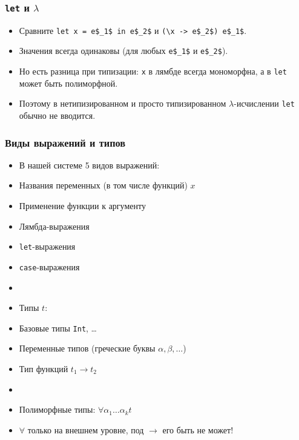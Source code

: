 \documentclass[11pt]{beamer}
\begin{document}
\begin{frame}[fragile]
\frametitle{\lstinline|let| и $\lambda$}
\begin{itemize}
    \item Сравните \lstinline[mathescape]|let x = e$_1$ in e$_2$| и \lstinline[mathescape]|(\x -> e$_2$) e$_1$|.
    \pause
    \item Значения всегда одинаковы (для любых \lstinline[mathescape]|e$_1$| и \lstinline[mathescape]|e$_2$|).
    \pause
    \item Но есть разница при типизации: \pause \lstinline|x| в лямбде всегда мономорфна, а в \lstinline|let| может быть полиморфной.
    \pause
    \item Поэтому в нетипизированном и просто типизированном $\lambda$-исчислении \lstinline|let| обычно не вводится.
\end{itemize}
\end{frame}

\begin{frame}[fragile]
\frametitle{Виды выражений и типов}
\begin{itemize}
    \item В нашей системе 5 видов выражений:
    \pause
    \item Названия переменных (в том числе функций) $x$ 
    \item Применение функции к аргументу
    \item Лямбда-выражения
    \item \lstinline|let|-выражения    
    \item \lstinline|case|-выражения    
    \item[]
    \pause
    \item Типы $t$:
    \pause
    \item Базовые типы \lstinline|Int|, \ldots
    \item Переменные типов (греческие буквы $\alpha, \beta, \ldots$)
    \item Тип функций $t_1 \to t_2$
    \item[]
    \pause
    \item Полиморфные типы: $\forall \alpha_1 \ldots \alpha_k t$
    \pause
    \item $\forall$ только на внешнем уровне, под $\to$ его быть не может!
\end{itemize}
\end{frame}
\end{document}
